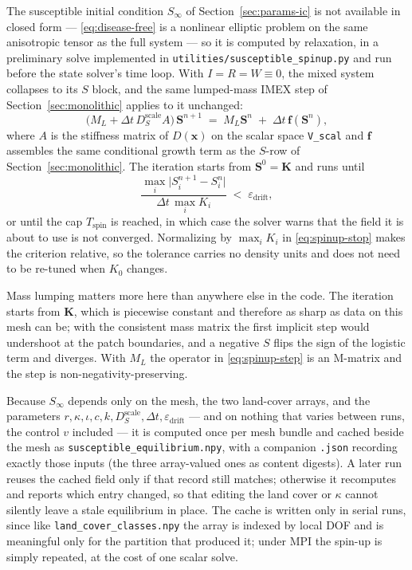 \documentclass[11pt]{article}
\begin{document}
The susceptible initial condition $S_\infty$ of Section~\ref{sec:params-ic} is not available in closed form --- \eqref{eq:disease-free} is a nonlinear elliptic problem on the same anisotropic tensor as the full system --- so it is computed by relaxation, in a preliminary solve implemented in \texttt{utilities/susceptible\_spinup.py} and run before the state solver's time loop. With $I=R=W\equiv0$, the mixed system collapses to its $S$ block, and the same lumped-mass IMEX step of Section~\ref{sec:monolithic} applies to it unchanged:
\begin{equation}
\big(M_L + \Delta t\,D_S^{\text{scale}} A\big)\,\mathbf{S}^{n+1} \;=\; M_L\mathbf{S}^{n} \;+\; \Delta t\,\mathbf{f}(\mathbf{S}^n),
\label{eq:spinup-step}
\end{equation}
where $A$ is the stiffness matrix of $D(\mathbf{x})$ on the scalar space \texttt{V\_scal} and $\mathbf{f}$ assembles the same conditional growth term as the $S$-row of Section~\ref{sec:monolithic}. The iteration starts from $\mathbf{S}^0 = \mathbf{K}$ and runs until
\begin{equation}
\frac{\max_i\big|S_i^{n+1}-S_i^{n}\big|}{\Delta t\,\max_i K_i} \;<\; \varepsilon_{\text{drift}},
\label{eq:spinup-stop}
\end{equation}
or until the cap $T_{\text{spin}}$ is reached, in which case the solver warns that the field it is about to use is not converged. Normalizing by $\max_i K_i$ in \eqref{eq:spinup-stop} makes the criterion relative, so the tolerance carries no density units and does not need to be re-tuned when $K_0$ changes.

Mass lumping matters more here than anywhere else in the code. The iteration starts from $\mathbf{K}$, which is piecewise constant and therefore as sharp as data on this mesh can be; with the consistent mass matrix the first implicit step would undershoot at the patch boundaries, and a negative $S$ flips the sign of the logistic term and diverges. With $M_L$ the operator in \eqref{eq:spinup-step} is an M-matrix and the step is non-negativity-preserving.

Because $S_\infty$ depends only on the mesh, the two land-cover arrays, and the parameters $r,\kappa,\iota,c,k,D_S^{\text{scale}},\Delta t,\varepsilon_{\text{drift}}$ --- and on nothing that varies between runs, the control $v$ included --- it is computed once per mesh bundle and cached beside the mesh as \texttt{susceptible\_equilibrium.npy}, with a companion \texttt{.json} recording exactly those inputs (the three array-valued ones as content digests). A later run reuses the cached field only if that record still matches; otherwise it recomputes and reports which entry changed, so that editing the land cover or $\kappa$ cannot silently leave a stale equilibrium in place. The cache is written only in serial runs, since like \texttt{land\_cover\_classes.npy} the array is indexed by local DOF and is meaningful only for the partition that produced it; under MPI the spin-up is simply repeated, at the cost of one scalar solve.
\end{document}
